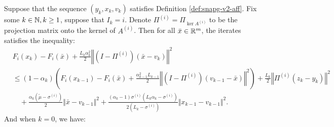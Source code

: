 \documentclass[12pt]{article}
\begin{document}
    \begin{lemma}\label{lemma:snagp2-one-step-s1-proto}
        Suppose that the sequence $(y_k, x_k, v_k)$ satisfies Definition \ref{def:snapg-v2-aff}. 
        Fix some $k \in \mathbb N, k \ge 1$, suppose that $I_k = i$.
        Denote $\Pi^{(i)} = \Pi_{\ker A^{(i)}}$ to be the projection matrix onto the kernel of $A^{(i)}$. 
        Then for all $\bar x \in \mathbb R^m$, the iterates satisfies the inequality: 
        \begin{align*}
            &F_i(x_{k}) - F_i(\bar x) 
            + \frac{L_k\alpha_k^2}{2} \left\Vert \left(I - \Pi^{(i)}\right)(\bar x - v_k)\right\Vert^2
            \\
            &\le 
            (1 - \alpha_k)\left(
                F_i(x_{k - 1}) - F_i(\bar x) + \frac{\alpha_{k - 1}^2L_{k - 1}}{2}
                \left\Vert \left(I - \Pi^{(i)}\right)(v_{k - 1} - \bar x)\right\Vert^2
            \right)     
            + \frac{L_k}{2}\left\Vert \Pi^{(i)}(z_k - y_k)\right\Vert^2
                \\ &\quad 
                + \frac{\alpha_k(\tilde\mu - \sigma^{(i)})}{2}\Vert \bar x - v_{k - 1}\Vert^2
                + \frac{(\alpha_k - 1)\sigma^{(i)}\left(L_k\alpha_k - \sigma^{(i)}\right)}{2\left(L_k - \sigma^{(i)}\right)}\Vert x_{k - 1} - v_{k - 1} \Vert^2.
        \end{align*}
        And when $k = 0$, we have: 
    \end{lemma}
\end{document}
